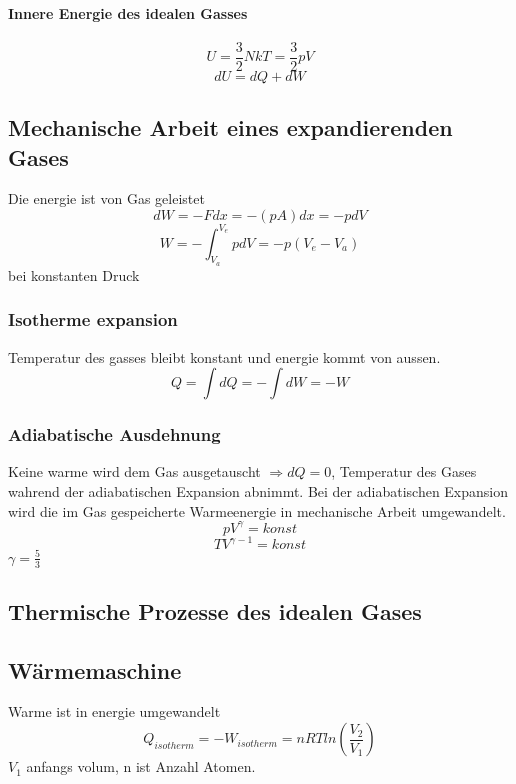 \documentclass[7pt]{article}
\begin{document}
\begin{multicols*}{3}
\paragraph{Innere Energie des idealen Gasses}
\begin{equation}
	U=\frac{3}{2}NkT=\frac{3}{2}pV
\end{equation}
\begin{equation}
	dU=dQ+dW
\end{equation}

\subsection{Mechanische Arbeit eines expandierenden Gases}
Die energie ist von Gas geleistet
\begin{equation}
	dW=-Fdx=-(pA)dx=-pdV
\end{equation}
\begin{equation}
	W=-\int^{V_e}_{V_a}pdV=-p(V_e-V_a)
\end{equation}
bei konstanten Druck
\subsubsection{Isotherme expansion}
Temperatur des gasses bleibt konstant und energie kommt von aussen.
\begin{equation}
	Q=\int dQ=-\int dW=-W
\end{equation}
\subsubsection{Adiabatische Ausdehnung}
Keine warme wird dem Gas ausgetauscht $\Rightarrow dQ=0$, Temperatur des Gases wahrend der adiabatischen Expansion abnimmt. Bei der adiabatischen Expansion wird die im Gas gespeicherte Warmeenergie in mechanische Arbeit umgewandelt.
\begin{equation}
	pV^\gamma=konst
\end{equation}
\begin{equation}
	TV^{\gamma -1 }=konst
\end{equation}
$\gamma=\frac{5}{3}$

\subsection{Thermische Prozesse des idealen Gases}

\subsection{W{\"a}rmemaschine}
Warme ist in energie umgewandelt
\begin{equation}
	Q_{isotherm}=-W_{isotherm}=nRTln(\frac{V_2}{V_1})
\end{equation}
$V_1$ anfangs volum, n ist Anzahl Atomen.

\end{multicols*}
\end{document}
